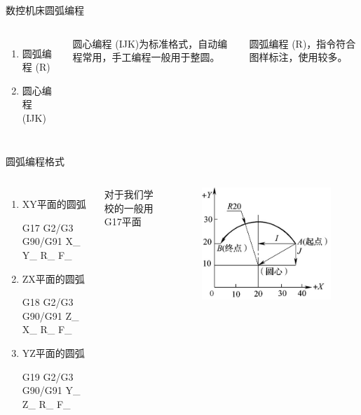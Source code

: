 \documentclass[UTF8,zihao=-4]{ctexbeamer}
\begin{document}
\begin{frame}{数控机床圆弧编程}
    \begin{columns}
        \begin{enumerate}
            \item 圆弧编程 (R)
            \item 圆心编程 (IJK)
        \end{enumerate}
         \vspace{1cm}
         圆心编程 (IJK)为标准格式，自动编程常用，手工编程一般用于整圆。
         
         圆弧编程 (R)，指令符合图样标注，使用较多。
    \end{columns}
\end{frame}

\begin{frame}{圆弧编程格式}
    \begin{columns}

 \begin{enumerate}
     \item XY平面的圆弧 
   
 G17  G2/G3  G90/G91 X\_ Y\_ R\_ F\_
 
 \item ZX平面的圆弧 
   
 G18 G2/G3 G90/G91 Z\_ X\_ R\_ F\_
 
\item  YZ平面的圆弧   
 
 G19 G2/G3 G90/G91 Y\_ Z\_ R\_ F\_
 
 \end{enumerate}
  对于我们学校的一般用G17平面
        \begin{figure}
            \centering
            \includegraphics[width=1\linewidth]{image/4-3}
            \caption{}
            \label{fig:4-3}
        \end{figure}
        
        
    \end{columns}
\end{frame}
\end{document}
